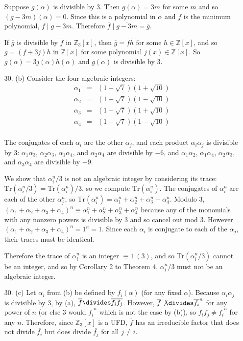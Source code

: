 \documentclass{article}
\newcommand{\Z}[0]{\mathbb{Z}}
\newcommand{\trace}[1]{\text{Tr}(#1)}
\begin{document}
\begin{enumerate}
Suppose $g(\alpha)$ is divisible by 3.  Then $g(\alpha) = 3m$ for some $m$ and so $(g - 3m)(\alpha) = 0$.  Since this is a polynomial in $\alpha$ and $f$ is the minimum polynomial, $f \mid g - 3m$.  Therefore $\overline{f} \mid \overline{g - 3m} = \overline{g}$.

If $\overline{g}$ is divisible by $\overline{f}$ in $\Z_3[x]$, then $\overline{g} = \overline{f}\overline{h}$ for some $h \in \Z[x]$, and so $g = (f + 3j)h$ in $\Z[x]$ for some polynomial $j(x) \in \Z[x]$.  So $g(\alpha) = 3j(\alpha)h(\alpha)$ and $g(\alpha)$ is divisible by 3.

\item[30. (b)] Consider the four algebraic integers:
\begin{eqnarray*}
    \alpha_1 &=& (1 + \sqrt{7})(1 + \sqrt{10}) \\
    \alpha_2 &=& (1 + \sqrt{7})(1 - \sqrt{10}) \\
    \alpha_3 &=& (1 - \sqrt{7})(1 + \sqrt{10}) \\
    \alpha_4 &=& (1 - \sqrt{7})(1 - \sqrt{10}) \\
\end{eqnarray*}

The conjugates of each $\alpha_i$ are the other $\alpha_j$, and each product $\alpha_i \alpha_j$ is divisible by 3: $\alpha_1 \alpha_3$, $\alpha_2 \alpha_3$, $\alpha_1 \alpha_4$, and $\alpha_2 \alpha_4$ are divisible by $-6$, and $\alpha_1 \alpha_2$, $\alpha_1 \alpha_4$, $\alpha_2 \alpha_3$, and $\alpha_3 \alpha_4$ are divisible by $-9$.

We show that $\alpha_i^n / 3$ is not an algebraic integer by considering its trace: $\trace{\alpha_i^n / 3} = \trace{\alpha_i^n} / 3$, so we compute $\trace{\alpha_i^n}$.  The conjugates of $\alpha_i^n$ are each of the other $\alpha_j^n$, so $\trace{\alpha_i^n} = \alpha_1^n + \alpha_2^n + \alpha_3^n + \alpha_4^n$.  Modulo 3, $(\alpha_1 + \alpha_2 + \alpha_3 + \alpha_4)^n \equiv \alpha_1^n + \alpha_2^n + \alpha_3^n + \alpha_4^n$ because any of the monomials with any nonzero powers is divisible by 3 and so cancel out mod 3.  However $(\alpha_1 + \alpha_2 + \alpha_3 + \alpha_4)^n = 1^n = 1$.  Since each $\alpha_i$ is conjugate to each of the $\alpha_j$, their traces must be identical.

Therefore the trace of $\alpha_i^n$ is an integer $\equiv 1\ (3)$, and so $\trace{\alpha_i^n / 3}$ cannot be an integer, and so by Corollary 2 to Theorem 4, $\alpha_i^n / 3$ must not be an algebraic integer.

\item[30. (c)] Let $\alpha_i$ from (b) be defined by $f_i(\alpha)$ (for any fixed $\alpha$).  Because $\alpha_i \alpha_j$ is divisible by 3, by (a), $\overline{f} \divides \overline{f_i}\overline{f_j}$.  However, $\overline{f} \not \divides \overline{f_i}^n$ for any power of $n$ (or else 3 would $\overline{f_i}^n$ which is not the case by (b)), so $\overline{f_i}\overline{f_j} \ne \overline{f_i}^n$ for any $n$.  Therefore, since $\Z_3[x]$ is a UFD, $\overline{f}$ has an irreducible factor that does not divide $\overline{f_i}$ but does divide $\overline{f_j}$ for all $j \neq i$.


\end{enumerate}
\end{document}
